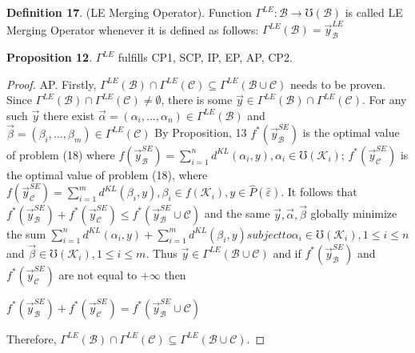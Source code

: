 \documentclass[]{iosart2c}
\begin{document}
    \textbf{Definition 17}. (LE Merging Operator). Function
    $\Gamma^{LE} : \mathcal{B} \to \mho(\mathcal{B})$ is called LE Merging Operator
    whenever it is defined as follows: $\Gamma^{LE}(\mathcal{B}) = \vec{y}^{LE}_\mathcal{B}$

    \textbf{Proposition 12}. $\Gamma^{LE}$ fulfills CP1, SCP, IP, EP, AP, CP2.

    \begin{proof}
        AP. Firstly, $\Gamma^{LE}(\mathcal{B}) \cap \Gamma^{LE}(\mathcal{C}) \subseteq \Gamma^{LE}(\mathcal{B} \cup \mathcal{C})$
        needs to be proven. Since $\Gamma^{LE}(\mathcal{B}) \cap \Gamma^{LE}(\mathcal{C}) \neq \emptyset$,
        there is some $\vec{y} \in \Gamma^{LE}(\mathcal{B}) \cap \Gamma^{LE}(\mathcal{C})$. For any
        such $\vec{y}$ there exist $\vec{\alpha} = (\alpha_i, ... , \alpha_n) \in \Gamma^{LE}(\mathcal{B})$
        and $\vec{\beta} = (\beta_i, ... , \beta_m) \in \Gamma^{LE}(\mathcal{C})$ By Proposition,
        13 $f^*(\vec{y}^{SE}_\mathcal{B} )$ is the optimal value of problem
        (18) where $f (\vec{y}^{SE}_\mathcal{B} ) = \sum^n_{i=1} d^{KL}(\alpha_i, y), \alpha_i \in \mho(\mathcal{K}_i)$;
        $f^*(\vec{y}^{SE}_\mathcal{C} )$ is the optimal value of problem (18),
        where $f (\vec{y}^{SE}_\mathcal{C} ) = \sum^m_{i=1} d^{KL}(\beta_i, y), \beta_i \in f(\mathcal{K}_i), y \in
        \widehat{P}(\hat{\varepsilon})$. It follows that $f^*(\vec{y}^{SE}_\mathcal{B} ) + f^*(\vec{y}^{SE}_\mathcal{C} ) \leq f^*(\vec{y}^{SE}_\mathcal{B}\cup\mathcal{C})$
        and the same $\vec{y}, \vec{\alpha}, \vec{\beta}$ globally minimize the sum $\sum^n_{i=1} d^{KL}(\alpha_i, y) +\sum^m_{i=1} d^{KL}(\beta_i, y) subject to \alpha_i \in
        \mho(\mathcal{K}_i), 1 \leq i \leq n$ and $\vec{\beta} \in \mho(\mathcal{K}_i), 1 \leq i \leq m$. Thus
        $\vec{y} \in \Gamma^{LE}(\mathcal{B} \cup \mathcal{C})$ and if $f^*(\vec{y}^{SE}_\mathcal{B} )$ and $f^*(\vec{y}^{SE}_\mathcal{C} )$ are not
        equal to $+\infty$ then

        $f^*(\vec{y}^{SE}_\mathcal{B} ) + f^*(\vec{y}^{SE}_\mathcal{C} ) = f^*(\vec{y}^{SE}_\mathcal{B}\cup\mathcal{C})$

        Therefore, $\Gamma^{LE}(\mathcal{B}) \cap \Gamma^{LE}(\mathcal{C}) \subseteq \Gamma^{LE}(\mathcal{B} \cup \mathcal{C})$.


\end{proof}
\end{document}
